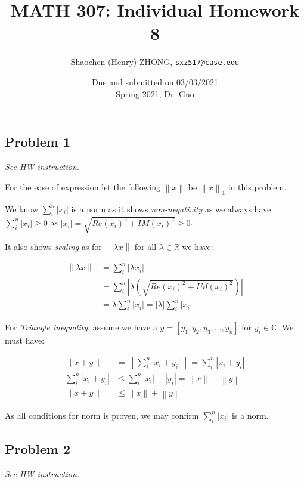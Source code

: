 \documentclass[11pt]{article}
\newcommand{\ilc}{\texttt}
\providecommand{\norm}[1]{\left\lVert #1 \right\rVert}
\providecommand{\len}[1]{\left| #1 \right|}
\begin{document}
\title{\textbf{MATH 307: Individual Homework 8}}


\author{Shaochen (Henry) ZHONG, \ilc{sxz517@case.edu}}

\date{Due and submitted on 03/03/2021 \\ Spring 2021, Dr. Guo}
\maketitle



\subsection*{Problem 1}
\textit{See HW instruction.}\newline

For the ease of expression let the following $\norm{x}$ be $\norm{x}_1$ in this problem.

We know $\sum_i^n \len{x_i}$ is a norm as it shows \textit{non-negativity} as we always have $\sum_i^n \len{x_i} \geq 0$ as $\len{x_i} = \sqrt{Re(x_i)^2 + IM(x_i)^2} \geq 0$.

It also shows \textit{scaling} as for $\norm{\lambda x}$ for all $\lambda \in \mathbb{R}$ we have:

\begin{align*}
    \norm{\lambda x} &= \sum_i^n \len{\lambda x_i} \\
    &= \sum_i^n \len{\lambda (\sqrt{Re(x_i)^2 + IM(x_i)^2})} \\
    &= \lambda \sum_i^n \len{x_i} = \len{\lambda} \sum_i^n \len{x_i}
\end{align*}

For \textit{Triangle inequality}, assume we have a $y = [y_1, y_2, y_3, \dots, y_n]$ for $y_i \in \mathbb{C}$. We must have:

\begin{align*}
    \norm{x + y} &= \norm{\sum_i^n \len{x_i + y_i}} =\sum_i^n \len{x_i + y_i} \\
    \sum_i^n \len{x_i + y_i} &\leq \sum_i^n \len{x_i} + \len{y_i} = \norm{x} + \norm{y} \\
    \norm{x + y} &\leq \norm{x} + \norm{y}
\end{align*}

As all conditions for norm is proven, we may confirm $\sum_i^n \len{x_i}$ is a norm.

\subsection*{Problem 2}
\textit{See HW instruction.}\newline
\end{document}
